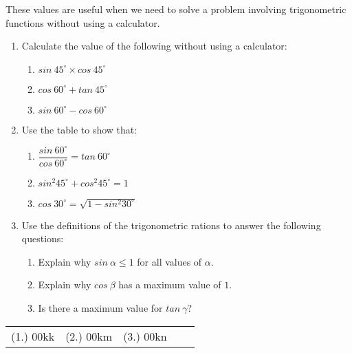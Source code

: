 \par
These values are useful when we need to solve a problem involving trigonometric functions without using a calculator.\par 
\begin{exercises}{}{
\begin{enumerate}[itemsep=6pt, label=\textbf{\arabic*}. ] 
\item Calculate the value of the following without using a calculator:
\begin{enumerate}[noitemsep, label=\textbf{(\alph*)} ]
\item $sin~ 45^{\circ} \times cos~ 45^{\circ}$
\item $cos~ 60^{\circ} + tan~ 45^{\circ}$
\item $sin~ 60^{\circ} - cos~ 60^{\circ}$
\end{enumerate}

\item Use the table to  show that:
\begin{enumerate}[itemsep=5pt, label=\textbf{(\alph*)} ]
\item $\dfrac{sin~ 60^{\circ}}{cos~ 60^{\circ}} = tan~ 60^{\circ} $
\item $sin^{2} 45^{\circ}+ cos^{2} 45^{\circ} =1 $
\item $cos~ 30^{\circ} =\sqrt{1- sin^{2} 30^{\circ}}$
\end{enumerate}

\item Use the definitions of the trigonometric rations to answer the following questions:
\begin{enumerate}[noitemsep, label=\textbf{(\alph*)} ]
\item Explain why $sin~ \alpha \leq 1$ for all values of $\alpha$.
\item Explain why $cos~ \beta$ has a maximum value of $1$.
\item Is there a maximum value for $tan~\gamma$?
\end{enumerate}
\end{enumerate}
\par \practiceinfo
\par \begin{tabular}[h]{ccccc}
(1.)	00kk	&
(2.)	00km	&
(3.)	00kn	&
\end{tabular}
}
\end{exercises}

